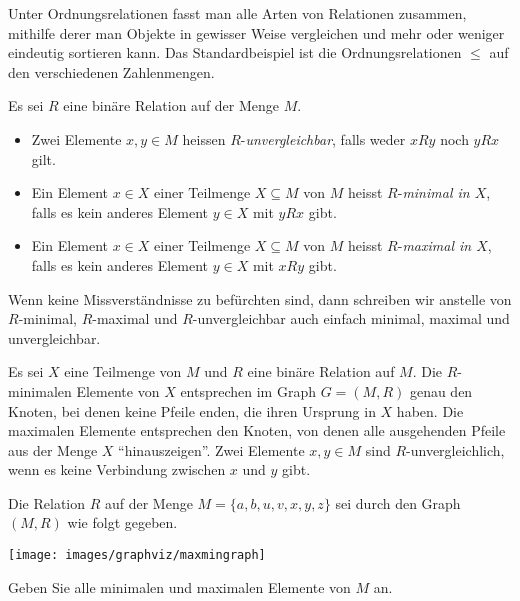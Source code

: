 Unter Ordnungsrelationen fasst man alle Arten von Relationen zusammen, mithilfe derer man
Objekte in gewisser Weise vergleichen und mehr oder weniger eindeutig sortieren kann. Das
Standardbeispiel ist die Ordnungsrelationen $\leq$ auf den verschiedenen Zahlenmengen.

\begin{df}\label{df:minimale elemente}
Es sei $R$ eine binäre Relation auf der Menge $M$.
\begin{itemize}
\item Zwei Elemente $x,y\in M$ heissen $R$-\textit{unvergleichbar}, falls weder $xRy$ noch $yRx$ gilt.
\item Ein Element $x\in X$ einer Teilmenge $X\subseteq M$ von $M$ heisst $R$-\textit{minimal in $X$}, falls es kein anderes Element $y\in X$ mit $yRx$ gibt.
\item  Ein Element $x\in X$ einer Teilmenge $X\subseteq M$ von $M$ heisst $R$-\textit{maximal in $X$}, falls es kein anderes Element $y\in X$ mit $xRy$ gibt.
\end{itemize}
Wenn keine Missverständnisse zu befürchten sind, dann schreiben wir anstelle von $R$-minimal, $R$-maximal und $R$-unvergleichbar auch einfach minimal, maximal und unvergleichbar.
\end{df}

\begin{rk}
Es sei $X$ eine Teilmenge von $M$ und $R$ eine binäre Relation auf $M$.
Die $R$-minimalen Elemente von $X$ entsprechen im Graph $G=(M,R)$ genau den Knoten, bei
denen keine Pfeile enden, die ihren Ursprung in $X$ haben. Die maximalen Elemente
entsprechen den Knoten, von denen alle ausgehenden Pfeile aus der Menge $X$
``hinauszeigen''. Zwei Elemente $x,y\in M$ sind $R$-unvergleichlich, wenn es keine
Verbindung zwischen $x$ und $y$ gibt.
\end{rk}

\begin{ueb}
Die Relation $R$ auf der Menge $M=\{a,b,u,v,x,y,z\}$ sei durch den Graph $(M,R)$ wie folgt
gegeben.
\begin{center}
\texttt{[image: images/graphviz/maxmingraph]}
\end{center}
Geben Sie alle minimalen und maximalen Elemente von $M$ an.
\end{ueb}
\begin{lsg}~
\end{lsg}

